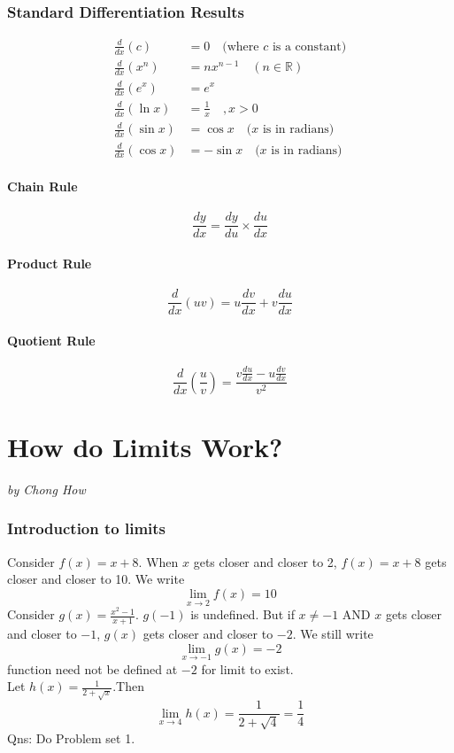 \documentclass[a4paper,12pt,oneside]{book}
\begin{document}
\subsection{Standard Differentiation Results}
\begin{align*}
    \frac{d}{dx}(c) &= 0 \quad \text{(where }c\text{ is a constant)}\\
    \frac{d}{dx}(x^n) &= nx^{n-1} \quad (n\in\mathbb{R})\\
    \frac{d}{dx}(e^x) &= e^x\\
    \frac{d}{dx}(\ln x) &= \frac{1}{x} \quad , x>0\\
    \frac{d}{dx}(\sin x) &= \cos x \quad \text{(}x\text{ is in radians)}\\
    \frac{d}{dx}(\cos x) &= -\sin x \quad \text{(}x\text{ is in radians)}
\end{align*}
\subsubsection{Chain Rule}
$$\displaystyle\frac{dy}{dx} = \frac{dy}{du} \times \frac{du}{dx}$$
\subsubsection{Product Rule}
$$\displaystyle\frac{d}{dx}(uv) = u \frac{dv}{dx}+ v\frac{du}{dx}$$
\subsubsection{Quotient Rule}
$$\displaystyle\frac{d}{dx}\left(\frac{u}{v}\right) = \frac{v\frac{du}{dx}-u\frac{dv}{dx}}{v^2}$$

\newpage
\chapter{How do Limits Work?}
\vspace{-30pt}
\large \textit{by Chong How}
\subsection{Introduction to limits}
Consider $f(x) = x+8$. When $x$ gets closer and closer to 2, $f(x) = x+8$ gets closer and closer to 10. We write \[ \lim_{x\to 2} f(x) = 10 \]
Consider $g(x) = \frac{x^2-1}{x+1}$. $g(-1)$ is undefined. But if $x\neq -1$ AND $x$ gets closer and closer to $-1$, $g(x)$ gets closer and closer to $-2$. We still write \[ \lim_{x\to -1} g(x) = -2 \]function need not be defined at $-2$ for limit to exist.\\
Let $h(x) = \frac{1}{2+\sqrt{x}}$.Then \[ \lim_{x\to 4} h(x) = \frac{1}{2+\sqrt{4}} = \frac{1}{4} \]
Qns: Do Problem set 1.
\end{document}
